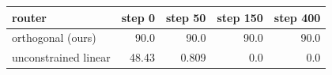 \begin{tabular}{lrrrr}
\toprule
router & step 0 & step 50 & step 150 & step 400 \\
\midrule
orthogonal (ours) & 90.0 & 90.0 & 90.0 & 90.0 \\
unconstrained linear & 48.43 & 0.809 & 0.0 & 0.0 \\
\bottomrule
\end{tabular}